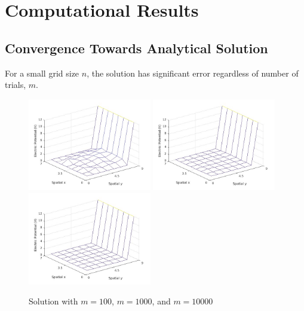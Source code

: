 \documentclass{amsart}
\begin{document}
\section{Computational Results}


\subsection{Convergence Towards Analytical Solution}

For a small grid size $n$, the solution has significant error regardless of number of trials, $m$.

\begin{figure}[H]
	\caption{Solution with $m=100$, $m=1000$, and $m=10000$}
	\includegraphics[width=0.48\textwidth]{solution_n=8_m=100.jpg}
	\includegraphics[width=0.48\textwidth]{solution_n=8_m=1000.jpg}
	\includegraphics[width=0.48\textwidth]{solution_n=8_m=10000.jpg}
\end{figure}
\end{document}
